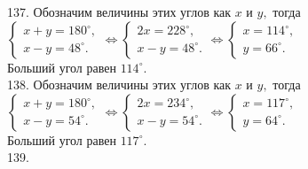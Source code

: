 \documentclass[12pt]{article}
\begin{document}
137. Обозначим величины этих углов как $x$ и $y,$ тогда $\begin{cases} x+y=180^\circ,\\x-y=48^\circ.\end{cases}\Leftrightarrow
\begin{cases} 2x=228^\circ,\\x-y=48^\circ.\end{cases}\Leftrightarrow\begin{cases} x=114^\circ,\\y=66^\circ.\end{cases}$\\
Больший угол равен $114^\circ.$\\
138. Обозначим величины этих углов как $x$ и $y,$ тогда $\begin{cases} x+y=180^\circ,\\x-y=54^\circ.\end{cases}\Leftrightarrow
\begin{cases} 2x=234^\circ,\\x-y=54^\circ.\end{cases}\Leftrightarrow\begin{cases} x=117^\circ,\\y=64^\circ.\end{cases}$\\
Больший угол равен $117^\circ.$\\
139. \begin{figure}[ht!]
\end{figure}\\
\end{document}
